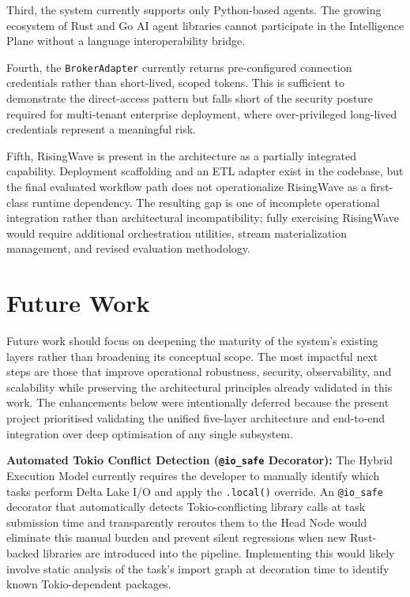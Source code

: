 \documentclass[12pt, a4paper]{report}
\begin{document}
Third, the system currently supports only Python-based agents.
The growing ecosystem of Rust and Go AI agent libraries cannot participate in the
Intelligence Plane without a language interoperability bridge.

Fourth, the \texttt{BrokerAdapter} currently returns pre-configured connection
credentials rather than short-lived, scoped tokens.
This is sufficient to demonstrate the direct-access pattern but falls short of the
security posture required for multi-tenant enterprise deployment, where over-privileged
long-lived credentials represent a meaningful risk.

Fifth, RisingWave is present in the architecture as a partially integrated capability.
Deployment scaffolding and an ETL adapter exist in the codebase, but the final
evaluated workflow path does not operationalize RisingWave as a first-class runtime
dependency.
The resulting gap is one of incomplete operational integration rather than
architectural incompatibility; fully exercising RisingWave would require additional
orchestration utilities, stream materialization management, and revised evaluation
methodology.

\section{Future Work}
\label{sec:future_work}

Future work should focus on deepening the maturity of the system's existing layers
rather than broadening its conceptual scope. The most impactful next steps are those
that improve operational robustness, security, observability, and scalability while
preserving the architectural principles already validated in this work. The enhancements
below were intentionally deferred because the present project prioritised validating
the unified five-layer architecture and end-to-end integration over deep optimisation
of any single subsystem.

\textbf{Automated Tokio Conflict Detection (\texttt{@io\_safe} Decorator):}
The Hybrid Execution Model currently requires the developer to manually identify which
tasks perform Delta Lake I/O and apply the \texttt{.local()} override.
An \texttt{@io\_safe} decorator that automatically detects Tokio-conflicting library
calls at task submission time and transparently reroutes them to the Head Node would
eliminate this manual burden and prevent silent regressions when new Rust-backed
libraries are introduced into the pipeline.
Implementing this would likely involve static analysis of the task's import graph at
decoration time to identify known Tokio-dependent packages.
\end{document}
